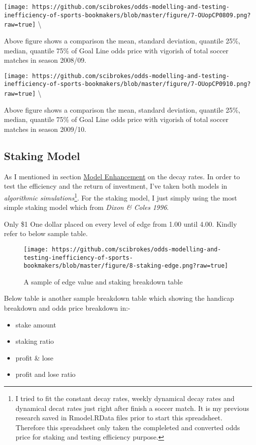 \documentclass[article]{jss}
\providecommand{\tightlist}{%
  \setlength{\itemsep}{0pt}\setlength{\parskip}{0pt}}
\begin{document}
\texttt{[image: https://github.com/scibrokes/odds-modelling-and-testing-inefficiency-of-sports-bookmakers/blob/master/figure/7-OUopCP0809.png?raw=true]}
\textbackslash{}

Above figure shows a comparison the mean, standard deviation, quantile
25\%, median, quantile 75\% of Goal Line odds price with vigorish of
total soccer matches in season 2008/09.

\texttt{[image: https://github.com/scibrokes/odds-modelling-and-testing-inefficiency-of-sports-bookmakers/blob/master/figure/7-OUopCP0910.png?raw=true]}
\textbackslash{}

Above figure shows a comparison the mean, standard deviation, quantile
25\%, median, quantile 75\% of Goal Line odds price with vigorish of
total soccer matches in season 2009/10.

\subsection{Staking Model}\label{staking-model}

As I mentioned in section \protect\hyperlink{model-enhancement}{Model
Enhancement} on the decay rates. In order to test the efficiency and the
return of investment, I've taken both models in \emph{algorithmic
simulations}\footnote{I tried to fit the constant decay rates, weekly
  dynamical decay rates and dynamical decat rates just right after
  finish a soccer match. It is my previous research saved in
  Rmodel.RData files prior to start this spreadsheet. Therefore this
  spreadsheet only taken the compleleted and converted odds price for
  staking and testing efficiency purpose.}. For the staking model, I
just simply using the most simple staking model which from \emph{Dixon
\& Coles 1996}. \bigbreak

Only \$1 One dollar placed on every level of edge from 1.00 until 4.00.
Kindly refer to below sample table. \bigbreak

\begin{figure}[htbp]
\centering
\texttt{[image: https://github.com/scibrokes/odds-modelling-and-testing-inefficiency-of-sports-bookmakers/blob/master/figure/8-staking-edge.png?raw=true]}
\caption{A sample of edge value and staking breakdown table}
\end{figure}

Below table is another sample breakdown table which showing the handicap
breakdown and odds price breakdown in:-

\begin{itemize}
\tightlist
\item
  stake amount
\item
  staking ratio
\item
  profit \& lose
\item
  profit and lose ratio
\end{itemize}
\end{document}
